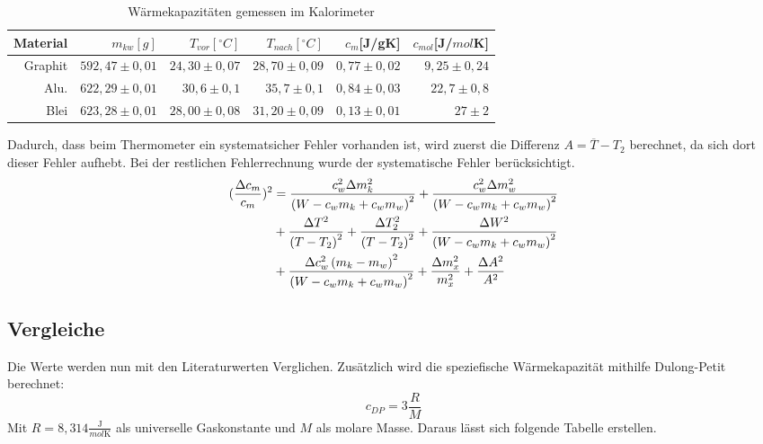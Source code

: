 \begin{table}[h!]
    \centering
    \begin{tabular}{r r r r r r}
        \toprule
        Material & $m_{kw}[g]$& $T_{vor} [^\circ C] $&  $T_{nach}[^\circ C] $& $c_m$[J/gK] & $c_{mol}$[J/$mol$K] \\
        \midrule
        Graphit & $592,47 \pm 0,01 $ & $24,30 \pm 0,07$ & $28,70 \pm 0,09$ & $0,77 \pm 0,02 $ & $9,25\pm0,24$\\
        Alu. &$622,29 \pm 0,01$ &$30,6 \pm 0,1 $&$ 35,7 \pm0,1$& $0,84 \pm 0,03$ & $22,7 \pm 0,8$\\
        Blei & $ 623,28 \pm 0,01$ & $28,00 \pm 0,08$& $31,20 \pm 0,09$ & $0,13 \pm 0,01$ & $27 \pm 2$\\
        \bottomrule
        
    \end{tabular}
    \caption{Wärmekapazitäten gemessen im Kalorimeter}
\end{table}
Dadurch, dass beim Thermometer ein systematsicher Fehler vorhanden ist, wird zuerst die Differenz $A = \overline{T} - T_2$ berechnet, da sich dort dieser Fehler aufhebt.
Bei der restlichen Fehlerrechnung wurde der systematische Fehler berücksichtigt.
\begin{align}
    (\frac{\Delta c_m}{c_m})^2 &=\frac{c_{w}^{2} \Delta m_{k}^{2}}{\left(W - c_{w} m_{k} + c_{w} m_{w}\right)^{2}} + \frac{c_{w}^{2} \Delta m_{w}^{2}}{\left(W - c_{w} m_{k} + c_{w} m_{w}\right)^{2}} \notag \\
    & + \frac{\Delta T^{2}}{\left(T - T_{2}\right)^{2}} + \frac{\Delta T_{2}^{2}}{\left(T - T_{2}\right)^{2}} + \frac{\Delta W^{2}}{\left(W - c_{w} m_{k} + c_{w} m_{w}\right)^{2}}\notag \\
    & + \frac{\Delta c_{w}^{2} \left(m_{k} - m_{w}\right)^{2}}{\left(W - c_{w} m_{k} + c_{w} m_{w}\right)^{2}} + \frac{\Delta m_{x}^{2}}{m_{x}^{2}} + \frac{\Delta A^{2}}{A^{2}}\notag\\
\end{align}

\subsection{Vergleiche}
Die Werte werden nun mit den Literaturwerten Verglichen. Zusätzlich wird die speziefische Wärmekapazität
mithilfe Dulong-Petit berechnet:
\begin{equation}
    c_{DP} = 3 \frac{R}{M}
\end{equation}
Mit $R = 8,314 \frac{\text{J}}{mol \text{K}}$ als universelle Gaskonstante und $M$ als molare Masse. Daraus
lässt sich folgende Tabelle erstellen.

